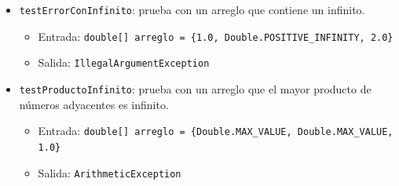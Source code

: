 \documentclass{article}
\begin{document}
\begin{itemize}
    \item \texttt{testErrorConInfinito}: prueba con un arreglo que contiene un infinito.
    
    \begin{itemize}
        \item Entrada: \texttt{double[] arreglo = \{1.0, Double.POSITIVE\_INFINITY, 2.0\}}
        \item Salida: \texttt{IllegalArgumentException}
    \end{itemize}

    \item \texttt{testProductoInfinito}: prueba con un arreglo que el mayor producto de números adyacentes es infinito.
    
    \begin{itemize}
        \item Entrada: \texttt{double[] arreglo = \{Double.MAX\_VALUE, Double.MAX\_VALUE, 1.0\}}
        \item Salida: \texttt{ArithmeticException}
    \end{itemize}

\end{itemize}
\end{document}
